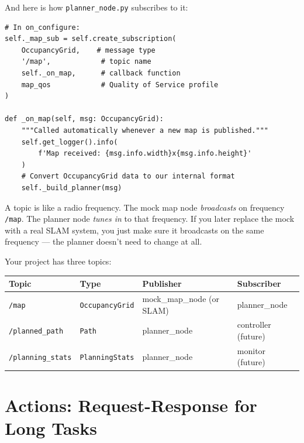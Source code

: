 \documentclass[12pt, a4paper]{article}
\begin{document}
And here is how \texttt{planner\_node.py} subscribes to it:

\begin{lstlisting}[style=python, caption={Subscribing to a topic (planner\_node.py, simplified)}]
# In on_configure:
self._map_sub = self.create_subscription(
    OccupancyGrid,    # message type
    '/map',            # topic name
    self._on_map,      # callback function
    map_qos            # Quality of Service profile
)

def _on_map(self, msg: OccupancyGrid):
    """Called automatically whenever a new map is published."""
    self.get_logger().info(
        f'Map received: {msg.info.width}x{msg.info.height}'
    )
    # Convert OccupancyGrid data to our internal format
    self._build_planner(msg)
\end{lstlisting}

\begin{analogybox}[Analogy]
A topic is like a radio frequency. The mock map node \emph{broadcasts}
on frequency \texttt{/map}. The planner node \emph{tunes in} to that
frequency. If you later replace the mock with a real SLAM system, you
just make sure it broadcasts on the same frequency --- the planner
doesn't need to change at all.
\end{analogybox}

Your project has three topics:

\begin{center}
\begin{tabular}{llll}
    \toprule
    \textbf{Topic} & \textbf{Type} & \textbf{Publisher} & \textbf{Subscriber} \\
    \midrule
    \texttt{/map} & \texttt{OccupancyGrid} & mock\_map\_node (or SLAM) & planner\_node \\
    \texttt{/planned\_path} & \texttt{Path} & planner\_node & controller (future) \\
    \texttt{/planning\_stats} & \texttt{PlanningStats} & planner\_node & monitor (future) \\
    \bottomrule
\end{tabular}
\end{center}


\section{Actions: Request-Response for Long Tasks}
\label{sec:actions}
\end{document}
